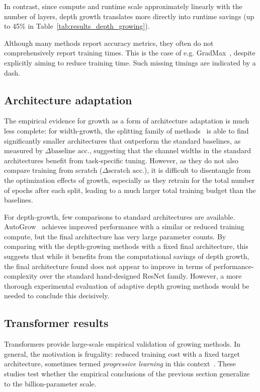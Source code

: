 In contrast, since compute and runtime scale approximately linearly with the number of layers, depth growth translates more directly into runtime savings (up to 45\% in Table~\ref{tab:results_depth_growing}).

Although many methods report accuracy metrics, they often do not comprehensively report training times. This is the case of e.g. GradMax~\citep{evci_gradmax_2022}, despite explicitly aiming to reduce training time. Such missing timings are indicated by a dash.

\subsection{Architecture adaptation}

The empirical evidence for growth as a form of architecture adaptation is much less complete: for width-growth, the splitting family of methods~\citep{liu_splitting_2019,wang_energy-aware_2020,wu_steepest_2021} is able to find significantly smaller architectures that outperform the standard baselines, as measured by $\Delta \textrm{baseline acc.}$, suggesting that the channel widths in the standard architectures benefit from task-specific tuning. However, as they do not also compare training from scratch ($\Delta \textrm{scratch acc.}$), it is difficult to disentangle from the optimization effects of growth, especially as they retrain for the total number of epochs after each split, leading to a much larger total training budget than the baselines.

For depth-growth, few comparisons to standard architectures are available. AutoGrow~\citep{wen_autogrow_2020} achieves improved performance with a similar or reduced training compute, but the final architecture has very large parameter counts. By comparing with the depth-growing methods with a fixed final architecture, this suggests that while it benefits from the computational savings of depth growth, the final architecture found does not appear to improve in terms of performance-complexity over the standard hand-designed ResNet family. However, a more thorough experimental evaluation of adaptive depth growing methods would be needed to conclude this decisively.


\subsection{Transformer results}\label{sec:results_transformers}

Transformers provide large-scale empirical validation of growing methods.
In general, the motivation is frugality: reduced training cost with a fixed target architecture, sometimes termed \emph{progressive learning} in this context~\citep{li_autoprog_2022,yao_msg_2024}.
These studies test whether the empirical conclusions of the previous section generalize to the billion-parameter scale.

